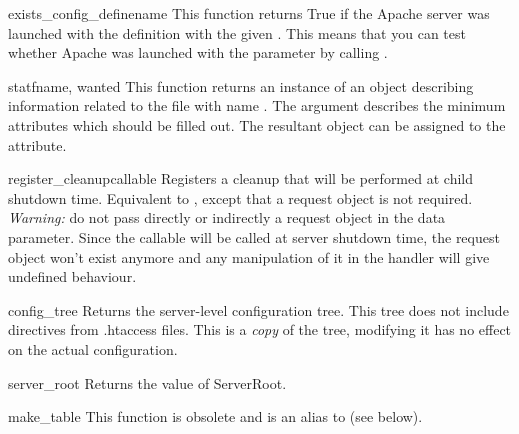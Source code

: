 \begin{funcdesc}{exists_config_define}{name}
    This function returns True if the Apache server was launched
    with the definition with the given . This means
    that you can test whether Apache was launched with the 
    parameter by calling .
\end{funcdesc}

\begin{funcdesc}{stat}{fname, wanted}
    This function returns an instance of an  object
    describing information related to the file with name .
    The  argument describes the minimum attributes which
    should be filled out. The resultant object can be assigned to the
     attribute.
\end{funcdesc}

\begin{funcdesc}{register_cleanup}{callable}
  Registers a cleanup that will be performed at child shutdown time. Equivalent
  to , except that a request object is not
  required.
  \emph{Warning:} do not pass directly or indirectly a request object in the
  data parameter. Since the callable will be called at server shutdown time,
  the request object won't exist anymore and any manipulation of it in the
  handler will give undefined behaviour.
\end{funcdesc}

\begin{funcdesc}{config_tree}{}
  Returns the server-level configuration tree. This tree does not
  include directives from .htaccess files. This is a \emph{copy} of
  the tree, modifying it has no effect on the actual configuration.
\end{funcdesc}

\begin{funcdesc}{server_root}{}
  Returns the value of ServerRoot.
\end{funcdesc}

\begin{funcdesc}{make_table}{} 
  This function is obsolete and is an alias to  (see below).
\end{funcdesc}


